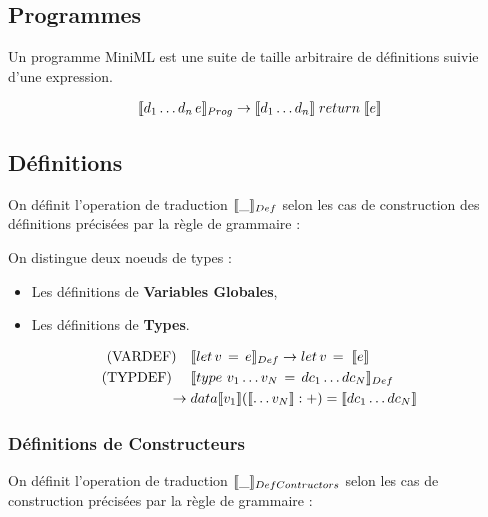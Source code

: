 \documentclass[
  12pt,
]{article}
\providecommand{\tightlist}{%
  \setlength{\itemsep}{0pt}\setlength{\parskip}{0pt}}
\begin{document}
\hypertarget{programmes-1}{%
  \subsection{Programmes}\label{programmes-1}}

Un programme MiniML est une suite de taille arbitraire de définitions suivie d'une expression.

\begin{align*}
  \llbracket d_1 \dots d_n \, e \rrbracket_{Prog} \rightarrow \llbracket d_1 \dots d_n \rrbracket\; return \; \llbracket e \rrbracket
\end{align*}

\pagebreak

\subsection{Définitions}\label{def}

On définit l'operation de traduction \(\llbracket \_ \rrbracket_{Def}\) selon les cas de construction
des définitions précisées par la règle de grammaire : 

On distingue deux noeuds de types :
\begin{itemize}
  \tightlist
  \item
        Les définitions de \textbf{Variables Globales},
  \item
        Les définitions de \textbf{Types}.
\end{itemize}
\begin{align*}
  \text{(VARDEF)}  \quad & \llbracket let \, v \, = \, e \rrbracket_{Def} \rightarrow   let \, v \, = \; \llbracket e \rrbracket       \\
  \text{(TYPDEF) } \quad & \llbracket type \, \, v_1 \dots v_N \, = \, dc_1 \dots  dc_N \rrbracket_{Def}                           \\
  \rightarrow \;         & data \llbracket v_1 \rrbracket (\llbracket \dots v_N \rrbracket : +) = \llbracket dc_1 \dots dc_N \rrbracket \\
\end{align*}
\subsubsection{Définitions de Constructeurs}\label{defConstruct}

On définit l'operation de traduction \(\llbracket \_ \rrbracket_{DefContructors}\) selon les cas de construction précisées par la règle de grammaire : 
\end{document}

